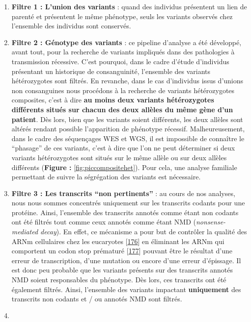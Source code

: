 \documentclass[12pt,a4paper,twoside]{ugathesis}
\theoremstyle{definition}
\theoremstyle{definition}
\theoremstyle{definition}
\theoremstyle{remark}
\begin{document}
\begin{enumerate}
\def\labelenumi{\arabic{enumi}.}
\item
  \textbf{Filtre 1 : L'union des variants} : quand des individus
  présentent un lien de parenté et présentent le même phénotype, seuls
  les variants observés chez l'ensemble des individus sont conservés.
\item
  \textbf{Filtre 2 : Génotype des variants} : ce pipeline d'analyse a
  été développé, avant tout, pour la recherche de variants impliqués
  dans des pathologies à transmission récessive. C'est pourquoi, dans le
  cadre d'étude d'individus présentant un historique de consanguinité,
  l'ensemble des variants hétérozygotes sont filtrés. En revanche, dans
  le cas d'individus issus d'unions non consanguines nous procédons à la
  recherche de variants hétérozygotes composites, c'est à dire
  \textbf{au moins deux variants hétérozygotes différents situés sur
  chacun des deux allèles du même gène d'un patient}. Dès lors, bien que
  les variants soient différents, les deux allèles sont altérés rendant
  possible l'apparition de phénotype récessif. Malheureusement, dans le
  cadre des séquençages WES et WGS, il est impossible de connaître le
  ``phasage'' de ces variants, c'est à dire que l'on ne peut déterminer
  si deux variants hétérozygotes sont situés sur le même allèle ou sur
  deux allèles différents (\textbf{Figure : }\ref{fig:piccompositehet}).
  Pour cela, une analyse familiale permettant de suivre la ségrégation
  des variants est nécessaire.
\item
  \textbf{Filtre 3 : Les transcrits ``non pertinents''} : au cours de
  nos analyses, nous nous sommes concentrés uniquement sur les
  transcrits codants pour une protéine. Ainsi, l'ensemble des transcrits
  annotés comme étant non codants ont été filtrés tout comme ceux
  annotés comme étant NMD (\emph{nonsense-mediated decay}). En effet, ce
  mécanisme a pour but de contrôler la qualité des ARNm cellulaires chez
  les eucaryotes {[}\protect\hyperlink{ref-Chang2007}{176}{]} en
  éliminant les ARNm qui comportent un codon stop prématuré
  {[}\protect\hyperlink{ref-Baker2004}{177}{]} pouvant être le résultat
  d'une erreur de transcription, d'une mutation ou encore d'une erreur
  d'épissage. Il est donc peu probable que les variants présents sur des
  transcrits annotés NMD soient responsables du phénotype. Dès lors, ces
  transcrits ont été également filtrés. Ainsi, l'ensemble des variants
  impactant \textbf{uniquement} des transcrits non codants et / ou
  annotés NMD sont filtrés.
\item

\end{enumerate}
\end{document}
